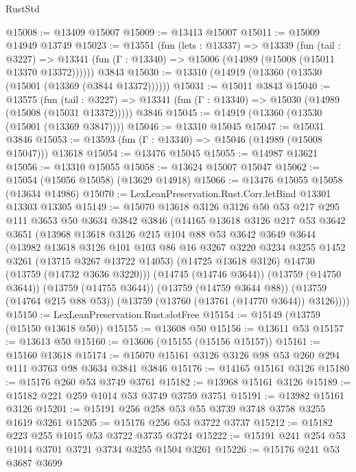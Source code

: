 \begin{lexlean}{RustStd}
\begin{coremodule}
@15008 := @13409 @15007
@15009 := @13413 @15007
@15011 := @15009 @14949 @13749
@15023 := @13551
    (fun (lets : @13337) =>
    @13339
      (fun (tail : @3227) =>
      @13341 (fun (Γ : @13340) => @15006 (@14989 (@15008 (@15011 @13370 @13372))))))
    @3843
@15030 := @13310 (@14919 (@13360 (@13530 (@15001 (@13369 (@3844 @13372))))))
@15031 := @15011 @3843
@15040 := @13575
    (fun (tail : @3227) => @13341 (fun (Γ : @13340) => @15030 (@14989 (@15008 (@15031 @13372)))))
    @3846
@15045 := @14919 (@13360 (@13530 (@15001 (@13369 @3847))))
@15046 := @13310 @15045
@15047 := @15031 @3846
@15053 := @13593 (fun (Γ : @13340) => @15046 (@14989 (@15008 @15047))) @13618
@15054 := @13476 @15045
@15055 := @14987 @13621
@15056 := @13310 @15055
@15058 := @13624 @15007 @15047
@15062 := @15054 (@15056 @15058) (@13629 @14918)
@15066 := @13476 @15055 @15058 (@13634 @14986)
@15070 := LexLeanPreservation.Rust.Corr.letBind @13301 @13303 @13305
@15149 := @15070
    @13618
    @3126
    @3126
    @50
    @53
    @217
    @295
    @111
    @3653
    @50
    @3634
    @3842
    @3846
    (@14165
      @13618
      @3126
      @217
      @53
      @3642
      @3651
      (@13968
        @13618
        @3126
        @215
        @104
        @88
        @53
        @3642
        @3649
        @3644
        (@13982
          @13618
          @3126
          @101
          @103
          @86
          @16
          @3267
          @3220
          @3234
          @3255
          @1452
          @3261
          (@13715 @3267 @13722 @14053)
          (@14725 @13618 @3126)
          @14730
          (@13759 (@14732 @3636 @3220)))
        (@14745 (@14746 @3644))
        (@13759 (@14750 @3644))
        (@13759 (@14755 @3644))
        (@13759 (@14759 @3644 @88))
        (@13759 (@14764 @215 @88 @53))
        (@13759 (@13760 (@13761 (@14770 @3644)) @3126))))
@15150 := LexLeanPreservation.Rust.slotFree
@15154 := @15149 (@13759 (@15150 @13618 @50))
@15155 := @13608 @50
@15156 := @13611 @53
@15157 := @13613 @50
@15160 := @13606 (@15155 (@15156 @15157))
@15161 := @15160 @13618
@15174 := @15070 @15161 @3126 @3126 @98 @53 @260 @294 @111 @3763 @98 @3634 @3841 @3846
@15176 := @14165 @15161 @3126
@15180 := @15176 @260 @53 @3749 @3761
@15182 := @13968 @15161 @3126
@15189 := @15182 @221 @259 @1014 @53 @3749 @3759 @3751
@15191 := @13982 @15161 @3126
@15201 := @15191 @256 @258 @53 @55 @3739 @3748 @3758 @3255 @1619 @3261
@15205 := @15176 @256 @53 @3722 @3737
@15212 := @15182 @223 @255 @1015 @53 @3722 @3735 @3724
@15222 := @15191 @241 @254 @53 @1014 @3701 @3721 @3734 @3255 @1504 @3261
@15226 := @15176 @241 @53 @3687 @3699

\end{coremodule}
\end{lexlean}
